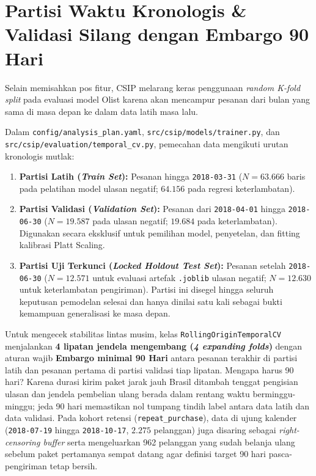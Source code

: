\documentclass[11pt,a4paper,oneside]{book}
\newcommand{\code}[1]{{\small\nolinkurl{#1}}}
\begin{document}
\section{Partisi Waktu Kronologis \& Validasi Silang dengan Embargo 90 Hari}

Selain memisahkan pos fitur, CSIP melarang keras penggunaan \emph{random K-fold split} pada evaluasi model Olist karena akan mencampur pesanan dari bulan yang sama di masa depan ke dalam data latih masa lalu.

Dalam \code{config/analysis_plan.yaml}, \code{src/csip/models/trainer.py}, dan \code{src/csip/evaluation/temporal_cv.py}, pemecahan data mengikuti urutan kronologis mutlak:
\begin{enumerate}
  \item \textbf{Partisi Latih (\emph{Train Set}):} Pesanan hingga \code{2018-03-31} ($N = 63.666$ baris pada pelatihan model ulasan negatif; $64.156$ pada regresi keterlambatan).
  \item \textbf{Partisi Validasi (\emph{Validation Set}):} Pesanan dari \code{2018-04-01} hingga \code{2018-06-30} ($N = 19.587$ pada ulasan negatif; $19.684$ pada keterlambatan). Digunakan secara eksklusif untuk pemilihan model, penyetelan, dan fitting kalibrasi Platt Scaling.
  \item \textbf{Partisi Uji Terkunci (\emph{Locked Holdout Test Set}):} Pesanan setelah \code{2018-06-30} ($N = 12.571$ untuk evaluasi artefak \code{.joblib} ulasan negatif; $N = 12.630$ untuk keterlambatan pengiriman). Partisi ini disegel hingga seluruh keputusan pemodelan selesai dan hanya dinilai satu kali sebagai bukti kemampuan generalisasi ke masa depan.
\end{enumerate}

Untuk mengecek stabilitas lintas musim, kelas \code{RollingOriginTemporalCV} menjalankan \textbf{4 lipatan jendela mengembang (\emph{4 expanding folds})} dengan aturan wajib \textbf{Embargo minimal 90 Hari} antara pesanan terakhir di partisi latih dan pesanan pertama di partisi validasi tiap lipatan. Mengapa harus 90 hari? Karena durasi kirim paket jarak jauh Brasil ditambah tenggat pengisian ulasan dan jendela pembelian ulang berada dalam rentang waktu berminggu-minggu; jeda 90 hari memastikan nol tumpang tindih label antara data latih dan data validasi. Pada kohort retensi (\code{repeat_purchase}), data di ujung kalender (\code{2018-07-19} hingga \code{2018-10-17}, $2.275$ pelanggan) juga disaring sebagai \emph{right-censoring buffer} serta mengeluarkan 962 pelanggan yang sudah belanja ulang sebelum paket pertamanya sempat datang agar definisi target 90 hari pasca-pengiriman tetap bersih.
\end{document}
